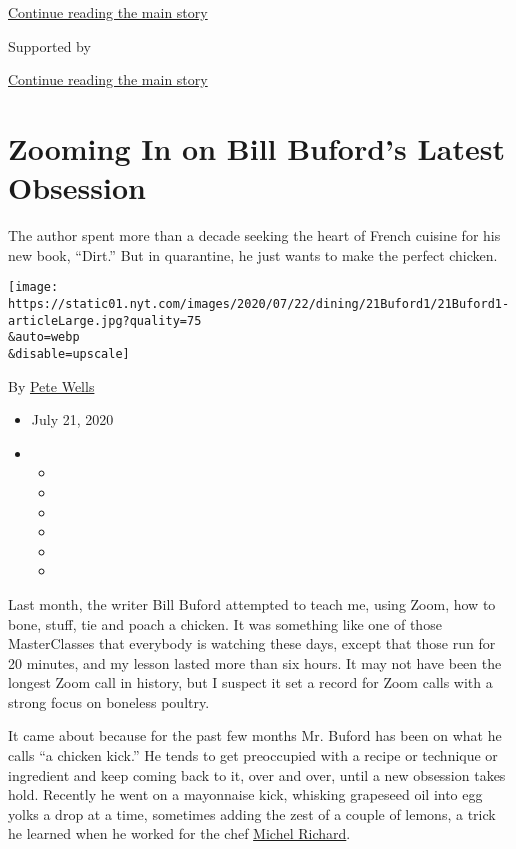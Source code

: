 \protect\hyperlink{after-top}{Continue reading the main story}

Supported by

\protect\hyperlink{after-sponsor}{Continue reading the main story}

\hypertarget{zooming-in-on-bill-bufords-latest-obsession}{%
\section{Zooming In on Bill Buford's Latest
Obsession}\label{zooming-in-on-bill-bufords-latest-obsession}}

The author spent more than a decade seeking the heart of French cuisine
for his new book, ``Dirt.'' But in quarantine, he just wants to make the
perfect chicken.

\texttt{[image: https://static01.nyt.com/images/2020/07/22/dining/21Buford1/21Buford1-articleLarge.jpg?quality=75\\\&auto=webp\\\&disable=upscale]}

By \href{https://www.nytimes.com/by/pete-wells}{Pete Wells}

\begin{itemize}
\item
  July 21, 2020
\item
  \begin{itemize}
  \item
  \item
  \item
  \item
  \item
  \item
  \end{itemize}
\end{itemize}

Last month, the writer Bill Buford attempted to teach me, using Zoom,
how to bone, stuff, tie and poach a chicken. It was something like one
of those MasterClasses that everybody is watching these days, except
that those run for 20 minutes, and my lesson lasted more than six hours.
It may not have been the longest Zoom call in history, but I suspect it
set a record for Zoom calls with a strong focus on boneless poultry.

It came about because for the past few months Mr. Buford has been on
what he calls ``a chicken kick.'' He tends to get preoccupied with a
recipe or technique or ingredient and keep coming back to it, over and
over, until a new obsession takes hold. Recently he went on a mayonnaise
kick, whisking grapeseed oil into egg yolks a drop at a time, sometimes
adding the zest of a couple of lemons, a trick he learned when he worked
for the chef
\href{https://www.nytimes.com/2016/08/16/dining/michel-richard-dead.html}{Michel
Richard}.

